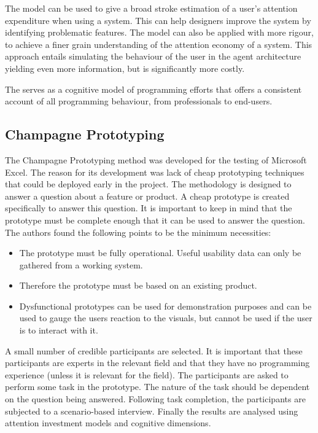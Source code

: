The model can be used to give a broad stroke estimation of a user's attention expenditure when using a system. This can help designers improve the system by identifying problematic features. The model can also be applied with more rigour, to achieve a finer grain understanding of the attention economy of a system. This approach entails simulating the behaviour of the user in the agent architecture yielding even more information, but is significantly more costly.

The \attention serves as a cognitive model of programming efforts that offers a consistent account of all programming behaviour, from professionals to end-users.

\subsection{Champagne Prototyping} \label{sec:champagne}
The Champagne Prototyping method was developed for the testing of Microsoft Excel\cite{blackwell2004champagne}. The reason for its development was lack of cheap prototyping techniques that could be deployed early in the project. The methodology is designed to answer a question about a feature or product. A cheap prototype is created specifically to answer this question. It is important to keep in mind that the prototype must be complete enough that it can be used to answer the question. The authors found the following points to be the minimum necessities:
\begin{itemize}
    \item The prototype must be fully operational. Useful usability data can only be gathered from a working system.
    \item Therefore the prototype must be based on an existing product.
    \item Dysfunctional prototypes can be used for demonstration purposes and can be used to gauge the users reaction to the visuals, but cannot be used if the user is to interact with it.
\end{itemize}
A small number of credible participants are selected. It is important that these participants are experts in the relevant field and that they have no programming experience (unless it is relevant for the field). The participants are asked to perform some task in the prototype. The nature of the task should be dependent on the question being answered. Following task completion, the participants are subjected to a scenario-based interview. Finally the results are analysed using attention investment models and cognitive dimensions.

